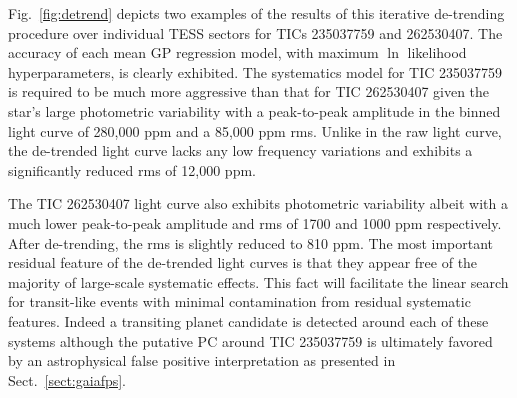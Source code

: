 Fig.~\ref{fig:detrend} depicts two examples of the results of this iterative de-trending procedure over
individual TESS sectors for TICs 235037759 and 262530407. The accuracy of each mean GP regression model,
with maximum $\ln$ likelihood hyperparameters, is clearly exhibited. The systematics model for TIC 235037759
is required to be much more aggressive than that for TIC 262530407
given the star's large photometric variability with a peak-to-peak
amplitude in the binned light curve of 280,000 ppm and a 85,000 ppm rms. Unlike in the raw
light curve, the de-trended light curve lacks any low frequency variations and exhibits a significantly
reduced rms of 12,000 ppm.

The TIC 262530407 light curve also exhibits photometric variability albeit with a much lower peak-to-peak
amplitude and rms of 1700 and 1000 ppm respectively. After de-trending, the rms is slightly reduced to 
810 ppm. The most important residual feature of the de-trended light curves is that they appear free
of the majority of large-scale systematic effects. This fact will facilitate the linear search for
transit-like events with minimal contamination from residual systematic features. Indeed 
a transiting planet candidate is detected
around each of these systems although the putative PC around TIC 235037759
is ultimately favored by an astrophysical false positive interpretation as presented in
Sect.~\ref{sect:gaiafps}.

